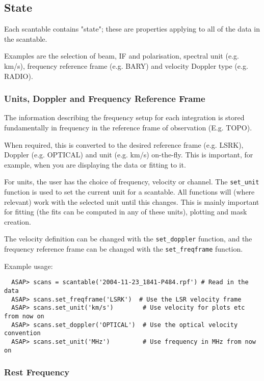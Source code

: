 \documentclass[11pt]{article}
\newcommand{\cmd}[1]{{\tt #1}}
\begin{document}
\subsection{State}

Each scantable contains "state"; these are properties  applying to all
of the data in the scantable.

Examples are the selection of beam, IF and polarisation,  spectral unit
(e.g. km/s), frequency reference frame (e.g. BARY) and velocity Doppler
type (e.g. RADIO).

\subsubsection{Units, Doppler and Frequency Reference Frame}

The information describing the frequency setup for each integration
is stored fundamentally in frequency in the reference frame
of observation (E.g. TOPO).

When required, this is converted to the desired reference frame
(e.g. LSRK), Doppler (e.g. OPTICAL) and unit (e.g. km/s) on-the-fly.
This is important, for example, when you are displaying the data or
fitting to it.

For units, the user has the choice of frequency, velocity or channel.
The \cmd{set\_unit} function is used to set the current unit for a
scantable. All functions will (where relevant) work with the selected
unit until this changes. This is mainly important for fitting (the fits
can be computed in any of these units), plotting and mask creation.

The velocity definition can be changed with the \cmd{set\_doppler}
function, and the frequency reference frame can be changed with the
\cmd{set\_freqframe} function.

Example usage:

\begin{verbatim}
  ASAP> scans = scantable('2004-11-23_1841-P484.rpf') # Read in the data
  ASAP> scans.set_freqframe('LSRK')  # Use the LSR velocity frame
  ASAP> scans.set_unit('km/s')        # Use velocity for plots etc from now on
  ASAP> scans.set_doppler('OPTICAL')  # Use the optical velocity convention
  ASAP> scans.set_unit('MHz')         # Use frequency in MHz from now on
\end{verbatim}


\subsubsection{Rest Frequency}
\end{document}
